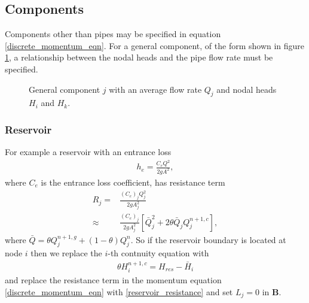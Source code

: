 \documentclass[12pt]{article}
\begin{document}
\subsection{Components}

Components other than pipes may be specified in equation \eqref{discrete_momentum_eqn}. For a general component, of the form shown in figure \ref{fig:general_component}, a relationship between the nodal heads and the pipe flow rate must be specified. 

\begin{figure}
\centering
{} 
\caption{General component $j$ with an average flow rate $Q_j$ and nodal heads $H_i$ and $H_k$.}
\label{fig:general_component}
\end{figure}

{\color{red}

\subsubsection{Reservoir}

For example a reservoir with an entrance loss 
\begin{align}
h_e = \frac{C_e Q^2}{2 g A^2},
\end{align}
where $C_e$ is the entrance loss coefficient, has resistance term
\begin{align}\label{reservoir_resistance}
R_j =& \frac{(C_e)_j Q_j^2}{2 g A_j^2} \\
\approx & \frac{(C_e)_j }{2 g A_j^2} \left[ \bar{Q}_j^2 + 2 \theta \bar{Q}_j Q_j^{n+1,c}  \right],
\end{align}
where $\bar{Q} = \theta Q_j^{n+1,g} + (1-\theta) Q_j^n$. So if the reservoir boundary is located at node $i$ then we replace the $i$-th contnuity equation with 
\begin{align}
\theta H_i^{n+1,c} = H_{res} - \bar{H}_i
\end{align}
and replace the resistance term in the momentum equation \eqref{discrete_momentum_eqn} with \eqref{reservoir_resistance} and set $L_j = 0$ in $\mathbf{B}$.

}
\end{document}
